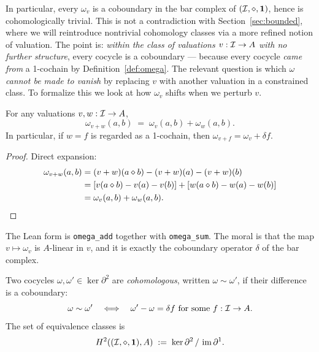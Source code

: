 In particular, every $\omega_v$ is a coboundary in the bar complex of
$(\mathcal{I},\mathbin{\diamond},\mathbf{1})$, hence is cohomologically trivial. This is not a contradiction
with Section~\ref{sec:bounded}, where we will reintroduce nontrivial
cohomology classes via a more refined notion of valuation. The point is:
\emph{within the class of valuations $v : \mathcal{I} \to A$ with no further
structure}, every cocycle is a coboundary --- because every cocycle
\emph{came from} a 1-cochain by Definition~\ref{def:omega}. The relevant
question is which $\omega$ \emph{cannot be made to vanish} by replacing $v$
with another valuation in a constrained class. To formalize this we look at
how $\omega_v$ shifts when we perturb $v$.

\begin{proposition}\label{prop:cob}
For any valuations $v, w : \mathcal{I} \to A$,
\begin{equation}\label{eq:shift}
  \omega_{v+w}(a,b) \;=\; \omega_v(a,b) + \omega_w(a,b).
\end{equation}
In particular, if $w = f$ is regarded as a 1-cochain, then $\omega_{v+f} =
\omega_v + \delta f$.
\end{proposition}

\begin{proof}
Direct expansion:
\begin{align*}
  \omega_{v+w}(a,b) &= (v+w)(a\mathbin{\diamond} b) - (v+w)(a) - (v+w)(b)\\
  &= [v(a\mathbin{\diamond} b) - v(a) - v(b)] + [w(a\mathbin{\diamond} b) - w(a) - w(b)]\\
  &= \omega_v(a,b) + \omega_w(a,b). \qedhere
\end{align*}
\end{proof}

The Lean form is \texttt{omega\_add} together with \texttt{omega\_sum}. The
moral is that the map $v \mapsto \omega_v$ is $A$-linear in $v$, and it is
exactly the coboundary operator $\delta$ of the bar complex.

\begin{definition}\label{def:cohomologous}
Two cocycles $\omega, \omega' \in \ker\partial^2$ are \emph{cohomologous},
written $\omega \sim \omega'$, if their difference is a coboundary:
\[
  \omega \sim \omega' \quad\Longleftrightarrow\quad \omega' - \omega = \delta
  f \text{ for some } f : \mathcal{I}\to A.
\]
The set of equivalence classes is
\[
  H^2((\mathcal{I},\mathbin{\diamond},\mathbf{1}), A) \;:=\; \ker\partial^2 \,/\, \operatorname{im}\partial^1.
\]
\end{definition}

